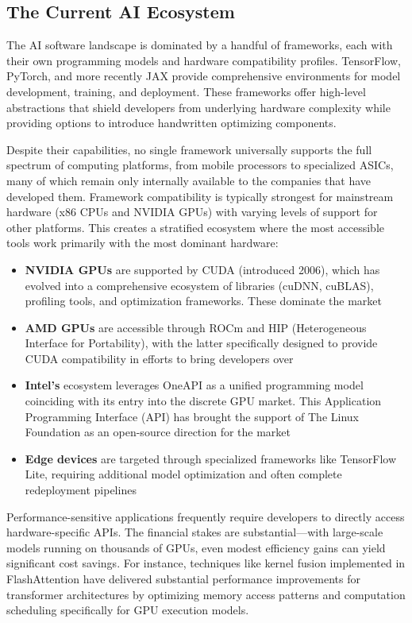 \documentclass[manuscript,screen,review,format=acmsmall]{acmart}
\begin{document}
\subsection{The Current AI Ecosystem}

The AI software landscape is dominated by a handful of frameworks, each with their own programming models and hardware compatibility profiles. TensorFlow, PyTorch, and more recently JAX provide comprehensive environments for model development, training, and deployment. These frameworks offer high-level abstractions that shield developers from underlying hardware complexity while providing options to introduce handwritten optimizing components.

Despite their capabilities, no single framework universally supports the full spectrum of computing platforms, from mobile processors to specialized ASICs, many of which remain only internally available to the companies that have developed them. Framework compatibility is typically strongest for mainstream hardware (x86 CPUs and NVIDIA GPUs) with varying levels of support for other platforms. This creates a stratified ecosystem where the most accessible tools work primarily with the most dominant hardware:

\begin{itemize}
    \item \textbf{NVIDIA GPUs} are supported by CUDA (introduced 2006), which has evolved into a comprehensive ecosystem of libraries (cuDNN, cuBLAS), profiling tools, and optimization frameworks. These dominate the market \cite{NvidiaDominanceYahoo}
    \item \textbf{AMD GPUs} are accessible through ROCm and HIP (Heterogeneous Interface for Portability), with the latter specifically designed to provide CUDA compatibility in efforts to bring developers over
    \item \textbf{Intel's} ecosystem leverages OneAPI as a unified programming model coinciding with its entry into the discrete GPU market. This Application Programming Interface (API) has brought the support of The Linux Foundation as an open-source direction for the market
    \item \textbf{Edge devices} are targeted through specialized frameworks like TensorFlow Lite, requiring additional model optimization and often complete redeployment pipelines
\end{itemize}

Performance-sensitive applications frequently require developers to directly access hardware-specific APIs. The financial stakes are substantial—with large-scale models running on thousands of GPUs, even modest efficiency gains can yield significant cost savings. For instance, techniques like kernel fusion implemented in FlashAttention \cite{FlashAttention} have delivered substantial performance improvements for transformer architectures by optimizing memory access patterns and computation scheduling specifically for GPU execution models.
\end{document}
